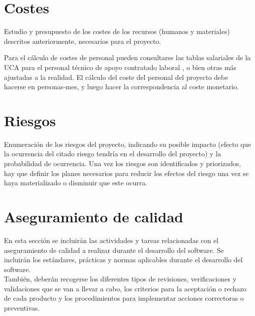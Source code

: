 \section{Costes}
Estudio y presupuesto de los costes de los recursos (humanos y materiales) descritos anteriormente, necesarios para el proyecto.

Para el cálculo de costes de personal pueden consultarse las tablas salariales de la UCA para el personal técnico de apoyo contratado laboral \cite{paslaboral}, o bien otras más ajustadas a la realidad. El cálculo del coste del personal del proyecto debe hacerse en personas-mes, y luego hacer la correspondencia al coste monetario.\\

\section{Riesgos}
Enumeración de los riesgos del proyecto, indicando su posible impacto (efecto que la ocurrencia del citado riesgo tendría en el desarrollo del proyecto) y la probabilidad de ocurrencia. Una vez los riesgos son identificados y priorizados, hay que definir los planes necesarios para reducir los efectos del riesgo una vez se haya materializado o disminuir que este ocurra.\\

\section{Aseguramiento de calidad}
En esta sección se incluirán las actividades y tareas relacionadas con el aseguramiento de calidad a realizar durante el desarrollo del software. Se incluirán los estándares, prácticas y normas aplicables durante el desarrollo del software.\\

También, deberán recogerse los diferentes tipos de revisiones, verificaciones y validaciones que se van a llevar a cabo, los criterios para la aceptación o rechazo de cada producto y los procedimientos para implementar acciones correctoras o preventivas.
